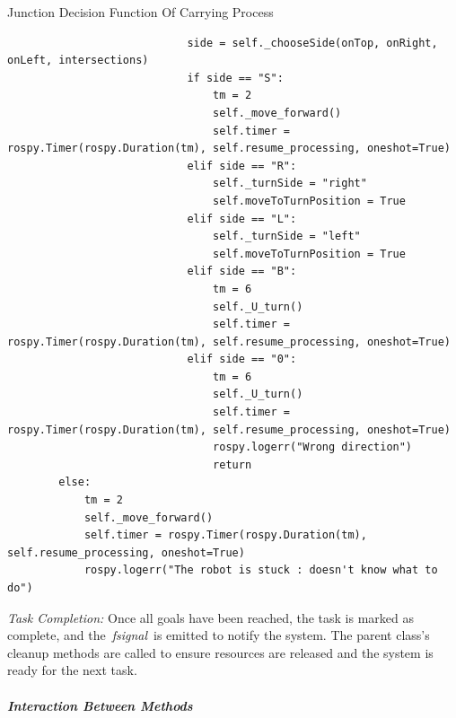 \documentclass[../../main]{subfiles}
\begin{document}
\begin{codebox}[label=judeFig37]{Junction Decision Function Of Carrying Process}
\begin{verbatim}
                            side = self._chooseSide(onTop, onRight, onLeft, intersections)
                            if side == "S":
                                tm = 2
                                self._move_forward()        
                                self.timer = rospy.Timer(rospy.Duration(tm), self.resume_processing, oneshot=True)
                            elif side == "R":
                                self._turnSide = "right"
                                self.moveToTurnPosition = True
                            elif side == "L":
                                self._turnSide = "left"
                                self.moveToTurnPosition = True
                            elif side == "B":
                                tm = 6
                                self._U_turn()         
                                self.timer = rospy.Timer(rospy.Duration(tm), self.resume_processing, oneshot=True)
                            elif side == "0":
                                tm = 6
                                self._U_turn()         
                                self.timer = rospy.Timer(rospy.Duration(tm), self.resume_processing, oneshot=True)
                                rospy.logerr("Wrong direction")
                                return
        else:
            tm = 2
            self._move_forward()        
            self.timer = rospy.Timer(rospy.Duration(tm), self.resume_processing, oneshot=True)
            rospy.logerr("The robot is stuck : doesn't know what to do")
\end{verbatim}
\end{codebox}
\emph{Task Completion:}
Once all goals have been reached, the task is marked as complete, and
the~\emph{fsignal}~is emitted to notify the system. The parent class's
cleanup methods are called to ensure resources are released and the
system is ready for the next task.

\subparagraph{Interaction Between Methods}
\end{document}
